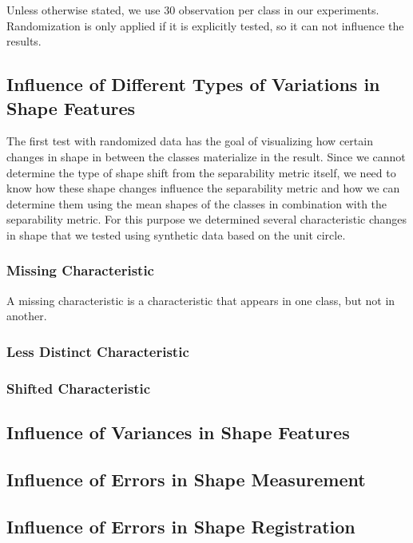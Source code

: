 \documentclass[pdftex,12pt,a4paper]{report}
\begin{document}
Unless otherwise stated, we use 30 observation per class in our experiments. Randomization is only applied if it is explicitly tested, so it can not influence the results.

\subsection{Influence of Different Types of Variations in Shape Features}

The first test with randomized data has the goal of visualizing how certain changes in shape in between the classes materialize in the result. Since we cannot determine the type of shape shift from the separability metric itself, we need to know how these shape changes influence the separability metric and how we can determine them using the mean shapes of the classes in combination with the separability metric. For this purpose we determined several characteristic changes in shape that we tested using synthetic data based on the unit circle.

\subsubsection{Missing Characteristic}

A missing characteristic is a characteristic that appears in one class, but not in another.

\subsubsection{Less Distinct Characteristic}

\subsubsection{Shifted Characteristic}

\subsection{Influence of Variances in Shape Features}

\subsection{Influence of Errors in Shape Measurement}

\subsection{Influence of Errors in Shape Registration}
\end{document}
